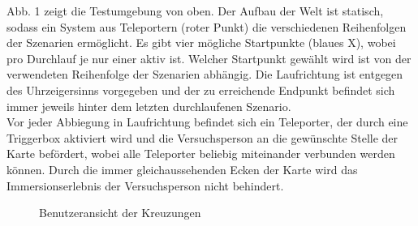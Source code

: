 \documentclass{Paper}
\begin{document}
Abb. 1 zeigt die Testumgebung von oben. Der Aufbau der Welt ist statisch, sodass ein System aus Teleportern (roter Punkt) die verschiedenen Reihenfolgen der Szenarien ermöglicht. Es gibt vier mögliche Startpunkte (blaues X), wobei pro Durchlauf je nur einer aktiv ist.
Welcher Startpunkt gewählt wird ist von der verwendeten Reihenfolge der Szenarien abhängig. Die Laufrichtung ist entgegen des Uhrzeigersinns vorgegeben und der zu erreichende Endpunkt befindet sich immer jeweils hinter dem letzten durchlaufenen Szenario.\\
Vor jeder Abbiegung in Laufrichtung befindet sich ein Teleporter, der durch eine Triggerbox aktiviert wird und die Versuchsperson an die gewünschte Stelle der Karte befördert, wobei alle Teleporter beliebig miteinander verbunden werden können. Durch die immer gleichaussehenden Ecken der Karte wird das Immersionserlebnis der Versuchsperson nicht behindert. 




\begin{figure}[H]



	\caption{Benutzeransicht der Kreuzungen}
	
\end{figure}
\end{document}
